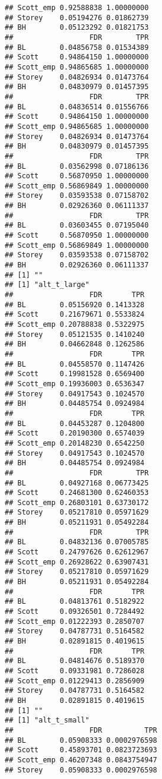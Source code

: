 \documentclass{article}\usepackage[]{graphicx}\usepackage[]{color}
\makeatletter
\newenvironment{kframe}{%
 \def\at@end@of@kframe{}%
 \ifinner\ifhmode%
  \def\at@end@of@kframe{\end{minipage}}%
  \begin{minipage}{\columnwidth}%
 \fi\fi%
 \def\FrameCommand##1{\hskip\@totalleftmargin \hskip-\fboxsep
 \colorbox{shadecolor}{##1}\hskip-\fboxsep
     \hskip-\linewidth \hskip-\@totalleftmargin \hskip\columnwidth}%
 \MakeFramed {\advance\hsize-\width
   \@totalleftmargin\z@ \linewidth\hsize
   \@setminipage}}%
 {\par\unskip\endMakeFramed%
 \at@end@of@kframe}
\newenvironment{knitrout}{}{} %
\makeatother
\begin{document}
\begin{knitrout}
\begin{kframe}
\begin{verbatim}
## Scott_emp 0.92588838 1.00000000
## Storey    0.05194276 0.01862739
## BH        0.05123292 0.01821753
##                  FDR        TPR
## BL        0.04856758 0.01534389
## Scott     0.94864150 1.00000000
## Scott_emp 0.94865685 1.00000000
## Storey    0.04826934 0.01473764
## BH        0.04830979 0.01457395
##                  FDR        TPR
## BL        0.04836514 0.01556766
## Scott     0.94864150 1.00000000
## Scott_emp 0.94865685 1.00000000
## Storey    0.04826934 0.01473764
## BH        0.04830979 0.01457395
##                  FDR        TPR
## BL        0.03562998 0.07186136
## Scott     0.56870950 1.00000000
## Scott_emp 0.56869849 1.00000000
## Storey    0.03593538 0.07158702
## BH        0.02926360 0.06111337
##                  FDR        TPR
## BL        0.03603455 0.07195040
## Scott     0.56870950 1.00000000
## Scott_emp 0.56869849 1.00000000
## Storey    0.03593538 0.07158702
## BH        0.02926360 0.06111337
## [1] ""
## [1] "alt_t_large"
##                  FDR       TPR
## BL        0.05156920 0.1413328
## Scott     0.21679671 0.5533824
## Scott_emp 0.20788838 0.5322975
## Storey    0.05121535 0.1410240
## BH        0.04662848 0.1262586
##                  FDR       TPR
## BL        0.04558570 0.1147426
## Scott     0.19981528 0.6569400
## Scott_emp 0.19936003 0.6536347
## Storey    0.04917543 0.1024570
## BH        0.04485754 0.0924984
##                  FDR       TPR
## BL        0.04453287 0.1204800
## Scott     0.20190300 0.6574039
## Scott_emp 0.20148230 0.6542250
## Storey    0.04917543 0.1024570
## BH        0.04485754 0.0924984
##                  FDR        TPR
## BL        0.04927168 0.06773425
## Scott     0.24681300 0.62460353
## Scott_emp 0.26803101 0.63730172
## Storey    0.05217810 0.05971629
## BH        0.05211931 0.05492284
##                  FDR        TPR
## BL        0.04832136 0.07005785
## Scott     0.24797626 0.62612967
## Scott_emp 0.26928622 0.63907431
## Storey    0.05217810 0.05971629
## BH        0.05211931 0.05492284
##                  FDR       TPR
## BL        0.04813761 0.5182922
## Scott     0.09326501 0.7284492
## Scott_emp 0.01222393 0.2850707
## Storey    0.04787731 0.5164582
## BH        0.02891815 0.4019615
##                  FDR       TPR
## BL        0.04814676 0.5189370
## Scott     0.09331981 0.7286028
## Scott_emp 0.01229413 0.2856909
## Storey    0.04787731 0.5164582
## BH        0.02891815 0.4019615
## [1] ""
## [1] "alt_t_small"
##                  FDR          TPR
## BL        0.05908333 0.0002976598
## Scott     0.45893701 0.0823723693
## Scott_emp 0.46207348 0.0843754947
## Storey    0.05908333 0.0002976598

\end{verbatim}
\end{kframe}
\end{knitrout}
\end{document}

